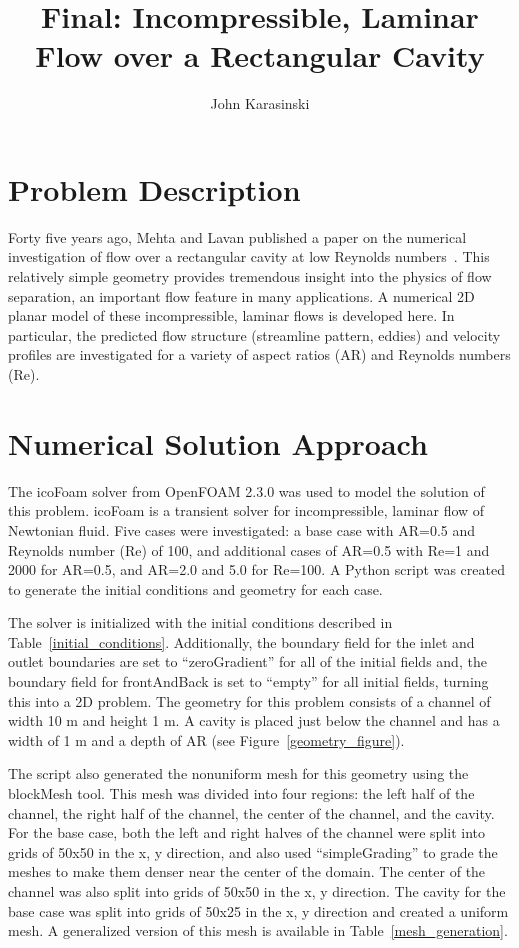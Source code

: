 \documentclass[twocolumn,10pt]{asme2ej}
\title{Final: Incompressible, Laminar Flow over a Rectangular Cavity}
\author{John Karasinski
    \affiliation{
  Graduate Student Researcher\\
  Center for Human/Robotics/Vehicle Integration and Performance\\
  Department of Mechanical and Aerospace Engineering\\
  University of California\\
  Davis, California 95616\\
    Email: karasinski@ucdavis.edu
    }
}
\begin{document}
\maketitle

\section{Problem Description}

Forty five years ago, Mehta and Lavan published a paper on the numerical investigation of flow over a rectangular cavity at low Reynolds numbers~\cite{mehta1969flow}. This relatively simple geometry provides tremendous insight into the physics of flow separation, an important flow feature in many applications. A numerical 2D planar model of these incompressible, laminar flows is developed here. In particular, the predicted flow structure (streamline pattern, eddies) and velocity profiles are investigated for a variety of aspect ratios (AR) and Reynolds numbers (Re).

\section{Numerical Solution Approach}

The icoFoam solver from OpenFOAM 2.3.0 was used to model the solution of this problem. icoFoam is a transient solver for incompressible, laminar flow of Newtonian fluid. Five cases were investigated: a base case with AR=0.5 and Reynolds number (Re) of 100, and additional cases of AR=0.5 with Re=1 and 2000 for AR=0.5, and AR=2.0 and 5.0 for Re=100. A Python script was created to generate the initial conditions and geometry for each case.

The solver is initialized with the initial conditions described in Table~\ref{initial_conditions}. Additionally, the boundary field for the inlet and outlet boundaries are set to ``zeroGradient'' for all of the initial fields and, the boundary field for frontAndBack is set to ``empty'' for all initial fields, turning this into a 2D problem. The geometry for this problem consists of a channel of width 10 m and height 1 m. A cavity is placed just below the channel and has a width of 1 m and a depth of AR (see Figure~\ref{geometry_figure}).

The script also generated the nonuniform mesh for this geometry using the blockMesh tool. This mesh was divided into four regions: the left half of the channel, the right half of the channel, the center of the channel, and the cavity. For the base case, both the left and right halves of the channel were split into grids of 50x50 in the x, y direction, and also used ``simpleGrading'' to grade the meshes to make them denser near the center of the domain. The center of the channel was also split into grids of 50x50 in the x, y direction. The cavity for the base case was split into grids of 50x25 in the x, y direction and created a uniform mesh. A generalized version of this mesh is available in Table~\ref{mesh_generation}.
\end{document}
